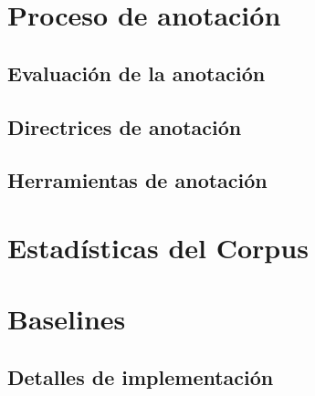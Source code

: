 \section{Proceso de anotaci\'on}

\subsection{Evaluaci\'on de la anotaci\'on}

\subsection{Directrices de anotaci\'on}

\subsection{Herramientas de anotaci\'on}


\section{Estad\'isticas del Corpus}

\section{Baselines}

\subsection{Detalles de implementaci\'on}

